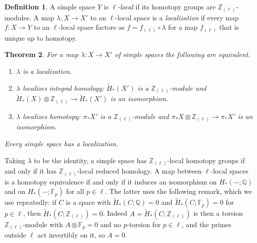 \documentclass[11pt]{amsart}
\theoremstyle{plain}
\newtheorem{theorem}{Theorem}[section]
\theoremstyle{definition}
\newtheorem{definition}[theorem]{Definition}
\numberwithin{equation}{section}
\newcommand{\Q}{\mathbb{Q}}
\newcommand{\F}{\mathbb{F}}
\newcommand{\Zl}{\mathbb{Z}_{(\ell)}}
\begin{document}
\begin{definition}
A simple space $Y$ is \emph{$\ell$-local} if its homotopy groups are $\Zl$-modules.
A map $\lambda\colon X\to X'$ to an $\ell$-local space is a \emph{localization} if every map $f\colon X\to Y$ to an $\ell$-local space factors as $f=f_{(\ell)}\circ\lambda$ for a map $f_{(\ell)}$ that is unique up to homotopy.
\end{definition}

\begin{theorem}\label{thm:localization}
For a map $\lambda\colon X\to X'$ of simple spaces the following are equivalent.
\begin{enumerate}[label=\textup{(\roman*)}]
\item $\lambda$ is a localization.
\item $\lambda$ localizes integral homology: $\widetilde H_*(X')$ is a $\Zl$-module and $\widetilde H_*(X)\otimes\Zl\to\widetilde H_*(X')$ is an isomorphism.
\item $\lambda$ localizes homotopy: $\pi_*X'$ is a $\Zl$-module and $\pi_*X\otimes\Zl\to\pi_*X'$ is an isomorphism.
\end{enumerate}
Every simple space has a localization.
\end{theorem}

Taking $\lambda$ to be the identity, a simple space has $\Zl$-local homotopy groups if and only if it has $\Zl$-local reduced homology.
A map between $\ell$-local spaces is a homotopy equivalence if and only if it induces an isomorphism on $H_*(-;\Q)$ and on $H_*(-;\F_p)$ for all $p\in\ell$.
The latter uses the following remark, which we use repeatedly: if $C$ is a space with $\widetilde H_*(C;\Q)=0$ and $\widetilde H_*(C;\F_p)=0$ for $p\in\ell$, then $\widetilde H_*(C;\Zl)=0$.
Indeed $A=\widetilde H_*(C;\Zl)$ is then a torsion $\Zl$-module with $A\otimes\F_p=0$ and no $p$-torsion for $p\in\ell$, and the primes outside $\ell$ act invertibly on it, so $A=0$.
\end{document}
